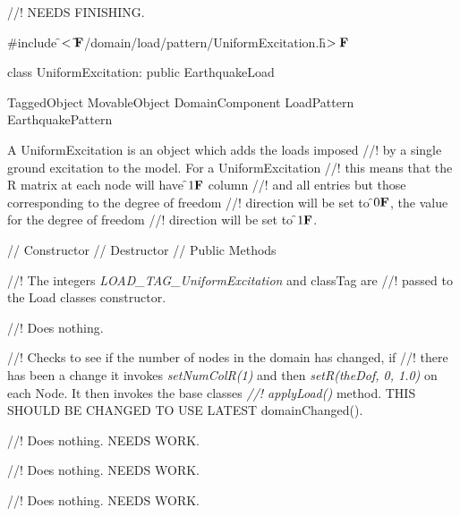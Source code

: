
//! NEEDS FINISHING.

\indent \#include \f$<\tilde{ }{\bf F}$/domain/load/pattern/UniformExcitation.h\f$>{\bf F}$

\indent class UniformExcitation: public EarthquakeLoad

\indent TaggedObject
\indent MovableObject
\indent\indent DomainComponent
\indent\indent\indent LoadPattern
\indent\indent\indent\indent EarthquakePattern
\indent\indent\indent{}

\indent A UniformExcitation is an object which adds the loads imposed
//! by a single ground excitation to the model. For a UniformExcitation
//! this means that the \p R matrix at each node will have \f$1{\bf F}$ column
//! and all entries but those corresponding to the degree of freedom
//! direction will be set to \f$0{\bf F}$, the value for the degree of freedom
//! direction will be set to \f$1{\bf F}$.

\indent // Constructor 
\indent // Destructor 
\indent // Public Methods 

//! The integers {\em LOAD\_TAG\_UniformExcitation} and \p classTag are
//! passed to the Load classes constructor.

//! Does nothing.

//! Checks to see if the number of nodes in the domain has changed, if
//! there has been a change it invokes {\em setNumColR(1)} and then 
{\em setR(theDof, 0, 1.0)} on each Node. It then invokes the base classes {\em
//! applyLoad()} method. THIS SHOULD BE CHANGED TO USE LATEST domainChanged().

//! Does nothing. NEEDS WORK.

//! Does nothing. NEEDS WORK.

//! Does nothing. NEEDS WORK. 


